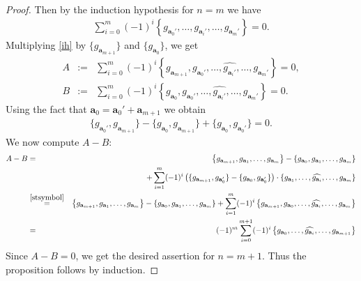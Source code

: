 \documentclass[12pt,amstex,amssymb]{article}
\theoremstyle{plain}
\theoremstyle{definition}
\newcommand{\be}{\begin{eqnarray*}}
\newcommand{\ee}{\end{eqnarray*}}
\newcommand{\bea}{\begin{eqnarray}}
\newcommand{\eea}{\end{eqnarray}}
\newcommand{\ba}{\mathbf{a}}
\begin{document}
{\begin{proof}
Then by the induction hypothesis for $n=m$ we have
\begin{eqnarray}\label{ih}
\sum_{i=0}^m (-1)^i \left\{g_{\ba_0'}, \ldots, \widehat{g_{\ba_i'}}, \ldots, g_{\ba_m'} \right\} =0.
\end{eqnarray}
Multiplying \eqref{ih} by $\{g_{\ba_{m+1}}\}$ and $\{g_{\ba_0}\}$, we get
\begin{eqnarray*}
A&:=&\sum_{i=0}^m (-1)^i \left\{g_{\ba_{m+1}}, g_{\ba_0'}, \ldots, \widehat{g_{\ba_i'}}, \ldots, g_{\ba_m'}  \right\} = 0,\\
B&:=&\sum_{i=0}^m (-1)^i \left\{g_{\ba_0}, g_{\ba_0'}, \ldots, \widehat{g_{\ba_i'}}, \ldots, g_{\ba_m'}  \right\} = 0.
\end{eqnarray*}
Using the fact that  $\ba_0=\ba_0'+\ba_{m+1}$ we obtain
\bea\label{stsymbol}
\{g_{\ba_0'}, g_{\ba_{m+1}}\} - \{g_{\ba_0},g_{\ba_{m+1} }\} + \{g_{\ba_0},g_{ \ba_0'}\} =0.
\eea
We now compute $A-B$:
\be
A-B &=&
\left\{g_{\ba_{m+1}}, g_{\ba_1}, \ldots, g_{\ba_m} \right\}  - \left\{g_{\ba_0}, g_{\ba_1}, \ldots, g_{\ba_m} \right\}\\
&&+ \sum_{i=1}^m (-1)^i \left( \{ g_{\ba_{m+1}}, g_{\ba_0'}\} - \{g_{\ba_0},g_{ \ba_0'}\}\right) \cdot \left\{g_{\ba_1}, \ldots, \widehat{g_{\ba_i}}, \ldots, g_{\ba_{m}}  \right\}
\\
&\stackrel{\eqref{stsymbol}}{=}&\left\{g_{\ba_{m+1}}, g_{\ba_1}, \ldots, g_{\ba_m} \right\} - \left\{g_{\ba_0}, g_{\ba_1}, \ldots, g_{\ba_m} \right\} +\sum_{i=1}^m (-1)^i \left\{g_{\ba_{m+1}}, g_{\ba_0}, \ldots, \widehat{g_{\ba_i}}, \ldots, g_{\ba_{m}}  \right\}\\
&=&(-1)^m  \sum_{i=0}^{m+1} (-1)^i \left\{g_{\ba_0}, \ldots, \widehat{g_{\ba_i}}, \ldots, g_{\ba_{m+1}} \right\}
\ee
Since $A-B=0$, we get the desired assertion for $n=m+1$.
Thus the proposition follows by induction.
\end{proof}


}
\end{document}
